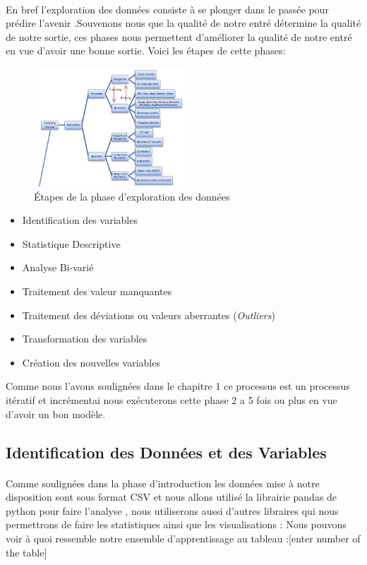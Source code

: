 \paragraph{}
En bref l'exploration des données consiste à se plonger dans le passée
pour prédire l'avenir .Souvenons nous que la qualité de notre entré
détermine la qualité de notre sortie, ces phases nous permettent
d'améliorer la qualité de notre entré en vue d'avoir une bonne sortie.
Voici les étapes de cette phases:
\begin{figure}[ht]
	\centering
	\includegraphics[width=0.5\textwidth]{fig/Exploration.png}
	\caption[Short caption]{Étapes de la phase d'exploration des données }
	\label{fig:imageExpSt}
\end{figure} 
\begin{itemize}
\item
  Identification des variables
\item
  Statistique Descriptive
\item
  Analyse Bi-varié
\item
  Traitement des valeur manquantes
\item
  Traitement des déviations  ou valeurs aberrantes (\emph{Outliers})  
\item
  Transformation des variables
\item
  Création des nouvelles variables
\end{itemize}
Comme nous l'avons soulignées dans le chapitre 1 ce processus est un
processus itératif et incrémentai nous exécuterons cette phase 2 a 5 fois ou plus en vue d'avoir un bon modèle.
\subsection{Identification des Données et des Variables}
\paragraph{}
Comme soulignées dans la phase d'introduction les données mise à notre
disposition sont sous format \ac {CSV} et nous allons utilisé la librairie pandas de python pour faire l'analyse , nous utiliserons aussi d'autres libraires qui nous permettrons de faire les statistiques ainsi que les visualisations :
Nous pouvons voir à quoi ressemble notre ensemble d'apprentissage au tableau :[enter number of the table]  \\ 

